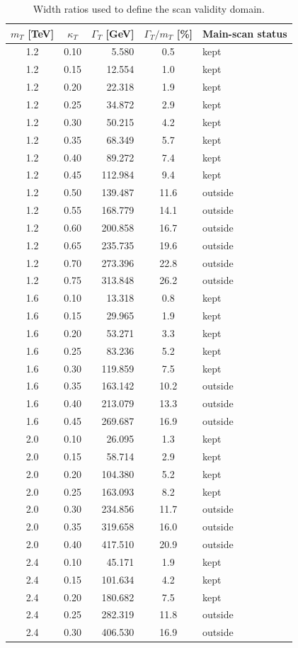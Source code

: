 \begin{table}[p]
\centering
\caption{Width ratios used to define the scan validity domain.}
\label{tab:width-ratios}
\begin{tabular}{ccrcl}
\toprule
$m_T$ [TeV] & $\kappa_T$ & $\Gamma_T$ [GeV] & $\Gamma_T/m_T$ [\%] & Main-scan status \\
\midrule
    1.2 & 0.10 & 5.580 & 0.5 & kept \\
    1.2 & 0.15 & 12.554 & 1.0 & kept \\
    1.2 & 0.20 & 22.318 & 1.9 & kept \\
    1.2 & 0.25 & 34.872 & 2.9 & kept \\
    1.2 & 0.30 & 50.215 & 4.2 & kept \\
    1.2 & 0.35 & 68.349 & 5.7 & kept \\
    1.2 & 0.40 & 89.272 & 7.4 & kept \\
    1.2 & 0.45 & 112.984 & 9.4 & kept \\
    1.2 & 0.50 & 139.487 & 11.6 & outside \\
    1.2 & 0.55 & 168.779 & 14.1 & outside \\
    1.2 & 0.60 & 200.858 & 16.7 & outside \\
    1.2 & 0.65 & 235.735 & 19.6 & outside \\
    1.2 & 0.70 & 273.396 & 22.8 & outside \\
    1.2 & 0.75 & 313.848 & 26.2 & outside \\
    1.6 & 0.10 & 13.318 & 0.8 & kept \\
    1.6 & 0.15 & 29.965 & 1.9 & kept \\
    1.6 & 0.20 & 53.271 & 3.3 & kept \\
    1.6 & 0.25 & 83.236 & 5.2 & kept \\
    1.6 & 0.30 & 119.859 & 7.5 & kept \\
    1.6 & 0.35 & 163.142 & 10.2 & outside \\
    1.6 & 0.40 & 213.079 & 13.3 & outside \\
    1.6 & 0.45 & 269.687 & 16.9 & outside \\
    2.0 & 0.10 & 26.095 & 1.3 & kept \\
    2.0 & 0.15 & 58.714 & 2.9 & kept \\
    2.0 & 0.20 & 104.380 & 5.2 & kept \\
    2.0 & 0.25 & 163.093 & 8.2 & kept \\
    2.0 & 0.30 & 234.856 & 11.7 & outside \\
    2.0 & 0.35 & 319.658 & 16.0 & outside \\
    2.0 & 0.40 & 417.510 & 20.9 & outside \\
    2.4 & 0.10 & 45.171 & 1.9 & kept \\
    2.4 & 0.15 & 101.634 & 4.2 & kept \\
    2.4 & 0.20 & 180.682 & 7.5 & kept \\
    2.4 & 0.25 & 282.319 & 11.8 & outside \\
    2.4 & 0.30 & 406.530 & 16.9 & outside \\
\bottomrule
\end{tabular}
\end{table}
